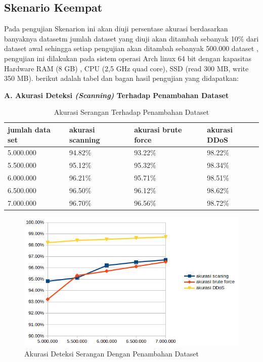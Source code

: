 	\newpage
	\subsection{Skenario Keempat}

	Pada pengujian Skenarion ini akan diuji persentase akurasi berdasarkan banyaknya datasetm jumlah dataset yang diuji akan ditambah sebanyak 10\% dari dataset awal sehingga setiap pengujian akan ditambah sebanyak 500.000 dataset , pengujian ini dilakukan pada sistem operasi Arch linux 64 bit dengan kapasitas Hardware RAM (8 GB) ,
	CPU (2,5 GHz quad core), SSD (read 300 MB, write 350 MB). berikut adalah tabel dan bagan hasil pengujian yang didapatkan:
\newline	


\noindent
\textbf{A. Akurasi Deteksi \emph{(Scanning)} Terhadap Penambahan Dataset}

	\begin{table}[H]
		\centering
		\caption{Akurasi Serangan Terhadap Penambahan Dataset}
		\label{Akurasi Serangan s Terhadap Penambahan Dataset}
		\begin{tabular}{|l|l|l|l|}
			\hline
			jumlah data set & akurasi scanning   & akurasi brute force & akurasi DDoS \\ \hline
			5.000.000       & 94.82\%   & 93.22\%  &  98.22\%     \\ \hline
			5.500.000       & 95.12\%   & 95.32\%  &  98.34\% \\ \hline
			6.000.000       & 96.21\%   & 95.71\%  &  98.51\%  \\ \hline
			6.500.000       & 96.50\%   & 96.12\%  &  98.62\%  \\ \hline
			7.000.000       & 96.70\%   & 96.56\%  &  98.72\%  \\ \hline
		\end{tabular}
	\end{table}


\begin{figure}[H]
	\centering
	\includegraphics[scale=0.7]{gambar/penambahanDataset}
	\caption{Akurasi Deteksi Serangan Dengan Penambahan Dataset}
	\label{Akurasi Deteksi Serangan Dengan Penambahan Dataset}
\end{figure}

